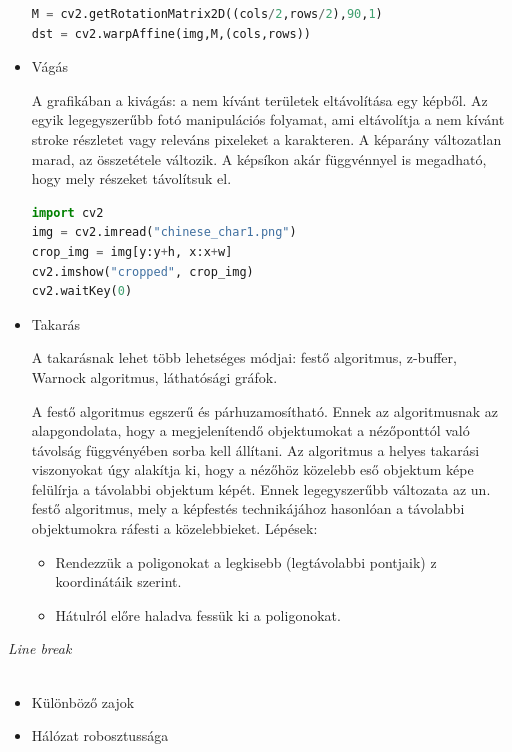 \begin{itemize}
\begin{lstlisting}[language=Python]
M = cv2.getRotationMatrix2D((cols/2,rows/2),90,1)
dst = cv2.warpAffine(img,M,(cols,rows))
\end{lstlisting}

\item Vágás

A grafikában a kivágás: a nem kívánt területek eltávolítása egy képből. Az egyik legegyszerűbb fotó manipulációs folyamat, ami eltávolítja a nem kívánt stroke részletet vagy releváns pixeleket a karakteren. A képarány változatlan marad, az összetétele változik. A képsíkon akár függvénnyel is megadható, hogy mely részeket távolítsuk el.

\begin{lstlisting}[language=Python]
import cv2
img = cv2.imread("chinese_char1.png")
crop_img = img[y:y+h, x:x+w]
cv2.imshow("cropped", crop_img)
cv2.waitKey(0)
\end{lstlisting}

\item Takarás

A takarásnak lehet több lehetséges módjai: festő algoritmus, z-buffer, Warnock algoritmus, láthatósági gráfok.

A festő algoritmus egszerű és párhuzamosítható. Ennek az algoritmusnak az alapgondolata, hogy a megjelenítendő objektumokat a nézőponttól való távolság függvényében sorba kell állítani. Az algoritmus a helyes takarási viszonyokat úgy alakítja ki, hogy a nézőhöz közelebb eső objektum képe felülírja a távolabbi objektum képét. Ennek legegyszerűbb változata az un. festő algoritmus, mely a képfestés technikájához hasonlóan a távolabbi objektumokra ráfesti a közelebbieket.
Lépések:
\begin{itemize}
\item Rendezzük a poligonokat a legkisebb (legtávolabbi pontjaik) z koordinátáik szerint.
\item Hátulról előre haladva fessük ki a poligonokat. 
\end{itemize}

\end{itemize}

\textit{Line break}\\\\

\begin{itemize}
	\item Különböző zajok
	\item Hálózat robosztussága
\end{itemize}

